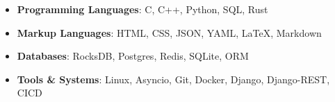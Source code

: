 \begin{itemize}[topsep=0pt, itemsep=0pt, parsep=0.5pt]
	\item \textbf{Programming Languages}: C, C++, Python, SQL, Rust
	\item \textbf{Markup Languages}: HTML, CSS, JSON, YAML, \LaTeX, Markdown
	\item \textbf{Databases}: RocksDB, Postgres, Redis, SQLite, ORM
	\item \textbf{Tools \& Systems}: Linux, Asyncio, Git, Docker, Django, Django-REST, CICD
\end{itemize}